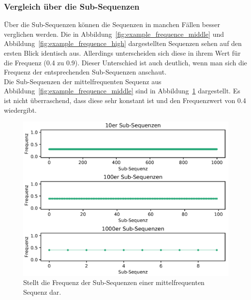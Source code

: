 \subsubsection{Vergleich über die Sub-Sequenzen}
Über die Sub-Sequenzen können die Sequenzen in manchen Fällen besser verglichen werden.
Die in Abbildung~\ref{fig:example_frequence_middle} und Abbildung~\ref{fig:example_frequence_high} dargestellten Sequenzen sehen auf den ersten Blick identisch aus.
Allerdings unterscheiden sich diese in ihrem Wert für die Frequenz (0.4 zu 0.9).
Dieser Unterschied ist auch deutlich, wenn man sich die Frequenz der entsprechenden Sub-Sequenzen anschaut.\\
Die Sub-Sequenzen der mittelfrequenten Sequenz aus Abbildung~\ref{fig:example_frequence_middle} sind in Abbildung~\ref{fig:example_frequence_middle_subsequences} dargestellt. 
Es ist nicht überraschend, dass diese sehr konstant ist und den Frequenzwert von 0.4 wiedergibt.
\begin{figure}[H]
	\includegraphics[width=\linewidth]{pythonImplementation/images/example_frequence_middle_subsequences.PNG}
	\caption[Darstellung der Sub-Sequenzen im Bezug auf die Frequenz einer mittelfrequenten Sequenz]{Stellt die Frequenz der Sub-Sequenzen einer mittelfrequenten Sequenz dar\footnotemark.}
	\label{fig:example_frequence_middle_subsequences}
\end{figure}

